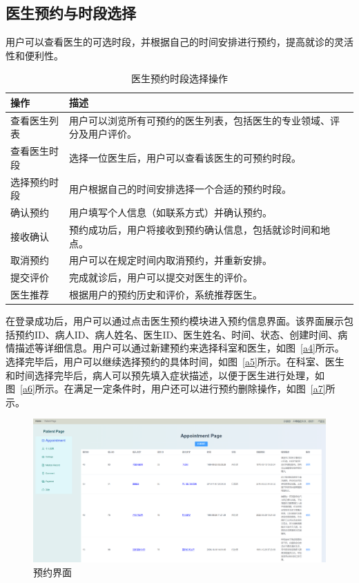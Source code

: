 \subsection{医生预约与时段选择}
用户可以查看医生的可选时段，并根据自己的时间安排进行预约，提高就诊的灵活性和便利性。
\begin{table}[htbp]
	\centering
	\begin{tabular}{|p{6cm}|p{6cm}|}
		\hline
		\textbf{操作} & \textbf{描述} \\
		\hline
		查看医生列表 & 用户可以浏览所有可预约的医生列表，包括医生的专业领域、评分及用户评价。 \\
		查看医生时段 & 选择一位医生后，用户可以查看该医生的可预约时段。 \\
		选择预约时段 & 用户根据自己的时间安排选择一个合适的预约时段。 \\
		确认预约 & 用户填写个人信息（如联系方式）并确认预约。 \\
		接收确认 & 预约成功后，用户将接收到预约确认信息，包括就诊时间和地点。 \\
		取消预约 & 用户可以在规定时间内取消预约，并重新安排。 \\
		提交评价 & 完成就诊后，用户可以提交对医生的评价。 \\
		医生推荐 & 根据用户的预约历史和评价，系统推荐医生。 \\
		\hline
	\end{tabular}
	\caption{医生预约时段选择操作}
\end{table}
在登录成功后，用户可以通过点击医生预约模块进入预约信息界面。该界面展示包括预约ID、病人ID、病人姓名、医生ID、医生姓名、时间、状态、创建时间、病情描述等详细信息。用户可以通过新建预约来选择科室和医生，如图~\ref{a4}所示。选择完毕后，用户可以继续选择预约的具体时间，如图~\ref{a5}所示。在科室、医生和时间选择完毕后，病人可以预先填入症状描述，以便于医生进行处理，如图~\ref{a6}所示。在满足一定条件时，用户还可以进行预约删除操作，如图~\ref{a7}所示。
\begin{figure}[!h]
	\centering
	\includegraphics[width=\textwidth]{figures/a4.png}
	\caption{预约界面}
\end{figure}

